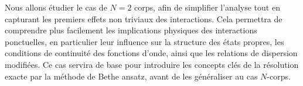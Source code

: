 \medskip

Nous allons étudier le cas de $N=2$ corps, afin de simplifier l’analyse tout en capturant les premiers effets non triviaux des interactions. Cela permettra de comprendre plus facilement les implications physiques des interactions ponctuelles, en particulier leur influence sur la structure des états propres, les conditions de continuité des fonctions d’onde, ainsi que les relations de dispersion modifiées. Ce cas servira de base pour introduire les concepts clés de la résolution exacte par la méthode de Bethe ansatz, avant de les généraliser au cas $N$-corps.

 




%
%
%
